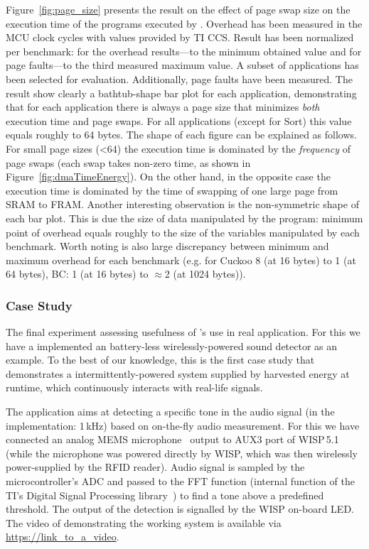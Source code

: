 Figure~\ref{fig:page_size} presents the result on the effect of page swap size on the execution time of the programs executed by \sys. Overhead has been measured in the MCU clock cycles with values provided by TI CCS. Result has been normalized per benchmark: for the overhead results---to the minimum obtained value and for page faults---to the third measured maximum value. A subset of applications has been selected for evaluation. Additionally, page faults have been measured. The result show clearly a bathtub-shape bar plot for each application, demonstrating that for each application there is always a page size that minimizes \emph{both} execution time and page swaps. For all applications (except for Sort) this value equals roughly to 64 bytes. The shape of each figure can be explained as follows. For small page sizes (<64) the execution time is dominated by the \emph{frequency} of page swaps (each swap takes non-zero time, as shown in Figure~\ref{fig:dmaTimeEnergy}). On the other hand, in the opposite case the execution time is dominated by the time of swapping of one large page from SRAM to FRAM. Another interesting observation is the non-symmetric shape of each bar plot. This is due the size of data manipulated by the program: minimum point of overhead equals roughly to the size of the variables manipulated by each benchmark. Worth noting is also large discrepancy between minimum and maximum overhead for each benchmark (e.g. for Cuckoo 8 (at 16 bytes) to 1 (at 64 bytes), BC: 1 (at 16 bytes) to $\approx$2 (at 1024 bytes)). 

\subsubsection{Case Study}
\label{sec:case_study}

The final experiment assessing usefulness of \sys's use in real application. For this we have a implemented an battery-less wirelessly-powered sound detector as an example. To the best of our knowledge, this is the first case study that demonstrates a intermittently-powered system supplied by harvested energy at runtime, which continuously interacts with real-life signals. 

The application aims at detecting a specific tone in the audio signal (in the implementation: 1\,kHz) based on on-the-fly audio measurement. For this we have connected an analog MEMS microphone~\cite{microphone} output to AUX3 port of WISP\,5.1 (while the microphone was powered directly by WISP, which was then wirelessly power-supplied by the RFID reader). Audio signal is sampled by the microcontroller's ADC and passed to the FFT function (internal function of the TI's Digital Signal Processing library~\cite{ti_dsp}) to find a tone above a predefined threshold. The output of the detection is signalled by the WISP on-board LED. The video of demonstrating the working system is available via \url{https://link_to_a_video}.

